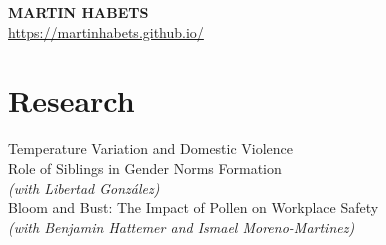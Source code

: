 \documentclass[12pt]{article}
\begin{document}

\begin{center}
    \textbf{\Large \textbf{MARTIN HABETS}} \\ \vspace{2pt} %
    \href{https://martinhabets.github.io/}{https://martinhabets.github.io/} \
\end{center}



\begin{comment}
This CV was written for specifically for positions I was applying for in
academia, and then modified to be a template.

A standard CV is about two pages long where as a resume in the US is one page.
sections can be added and removed here with this in mind. In my experience, 
education, and applicable work experience and skills are the most import things
to include on a resume. For a CV the Europass CV suggests the categories: Work
Experience, Education and Training, Language Skills, Digital Skills,
Communication and Interpersonal Skills, Conferences and Seminars, Creative Works
Driver's License, Hobbies and Interests, Honors and Awards, Management and
Leadership Skills, Networks and Memberships, Organizational Skills, Projects,
Publications, Recommendations, Social and Political Activities, Volunteering.

Your goal is to convey a who, what , when, where, why for every item you share. 
The who is obviously you, but I believe the rest should be done in that order.
For example below. An employer cares most about the degree held and typically 
less about the institution or where it is located (This is still good 
information though). Whatever order you choose be consistent throughout.
\end{comment}




\section{Research}
 \begin{itemize}[leftmargin=0.5cm, label={}]
    \small{\item{
	Temperature Variation and Domestic Violence\\
	\vspace{.2cm}
	Role of Siblings in Gender Norms Formation \\ \textit{(with Libertad González)}\\
	\vspace{.2cm}
	Bloom and Bust: The Impact of Pollen on Workplace Safety \\
	\textit{(with Benjamin Hattemer and Ismael Moreno-Martinez)}\\
    }}
 \end{itemize}
 
\end{document}
